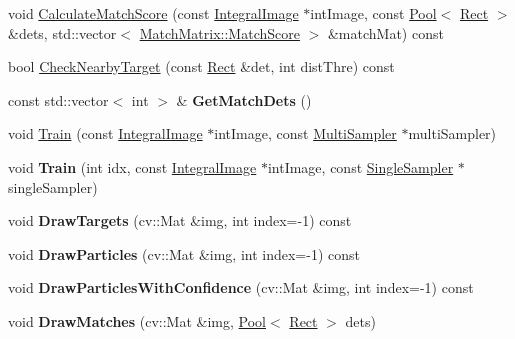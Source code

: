 \begin{DoxyCompactItemize}
\item 
void \hyperlink{classTargetsFreeList_a5a8a36a78a916259c0df3f17fcd837f0}{Calculate\+Match\+Score} (const \hyperlink{classIntegralImage}{Integral\+Image} $\ast$int\+Image, const \hyperlink{classPool}{Pool}$<$ \hyperlink{classRect}{Rect} $>$ \&dets, std\+::vector$<$ \hyperlink{structMatchMatrix_1_1MatchScore}{Match\+Matrix\+::\+Match\+Score} $>$ \&match\+Mat) const 
\item 
bool \hyperlink{classTargetsFreeList_a763e34bae15ed0f7feb255baa60c6096}{Check\+Nearby\+Target} (const \hyperlink{classRect}{Rect} \&det, int dist\+Thre) const 
\item 
\hypertarget{classTargetsFreeList_a0108fcb6355d6db4c599a95e7cc13e94}{}const std\+::vector$<$ int $>$ \& {\bfseries Get\+Match\+Dets} ()\label{classTargetsFreeList_a0108fcb6355d6db4c599a95e7cc13e94}

\item 
void \hyperlink{classTargetsFreeList_abf67eb9c2bbef26350460597ba017d3b}{Train} (const \hyperlink{classIntegralImage}{Integral\+Image} $\ast$int\+Image, const \hyperlink{classMultiSampler}{Multi\+Sampler} $\ast$multi\+Sampler)
\item 
\hypertarget{classTargetsFreeList_a909bf5b6bff911d54e19b5b40b3e867b}{}void {\bfseries Train} (int idx, const \hyperlink{classIntegralImage}{Integral\+Image} $\ast$int\+Image, const \hyperlink{classSingleSampler}{Single\+Sampler} $\ast$single\+Sampler)\label{classTargetsFreeList_a909bf5b6bff911d54e19b5b40b3e867b}

\item 
\hypertarget{classTargetsFreeList_ab86808dde009bd794ac39cc0ea58559b}{}void {\bfseries Draw\+Targets} (cv\+::\+Mat \&img, int index=-\/1) const \label{classTargetsFreeList_ab86808dde009bd794ac39cc0ea58559b}

\item 
\hypertarget{classTargetsFreeList_ad8a27707e9cd557e3f1c55abc3e9b317}{}void {\bfseries Draw\+Particles} (cv\+::\+Mat \&img, int index=-\/1) const \label{classTargetsFreeList_ad8a27707e9cd557e3f1c55abc3e9b317}

\item 
\hypertarget{classTargetsFreeList_ae54b269e667b5c198bf7170f86475c09}{}void {\bfseries Draw\+Particles\+With\+Confidence} (cv\+::\+Mat \&img, int index=-\/1) const \label{classTargetsFreeList_ae54b269e667b5c198bf7170f86475c09}

\item 
\hypertarget{classTargetsFreeList_abafc30cce178ddc20cd07b527c9273ba}{}void {\bfseries Draw\+Matches} (cv\+::\+Mat \&img, \hyperlink{classPool}{Pool}$<$ \hyperlink{classRect}{Rect} $>$ dets)\label{classTargetsFreeList_abafc30cce178ddc20cd07b527c9273ba}

\end{DoxyCompactItemize}
